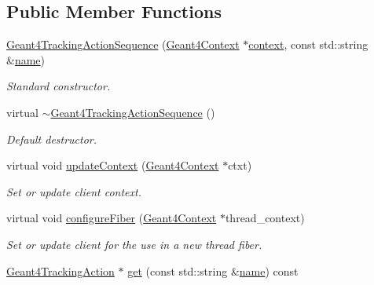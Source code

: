 \subsection*{Public Member Functions}
\begin{DoxyCompactItemize}
\item 
\hyperlink{class_d_d4hep_1_1_simulation_1_1_geant4_tracking_action_sequence_aea13a63c92a90e23145f5b2ab1f96c6e}{Geant4\+Tracking\+Action\+Sequence} (\hyperlink{class_d_d4hep_1_1_simulation_1_1_geant4_context}{Geant4\+Context} $\ast$\hyperlink{class_d_d4hep_1_1_simulation_1_1_geant4_action_aa9d87f0ec2a72b7fc2591b18f98d75cf}{context}, const std\+::string \&\hyperlink{class_d_d4hep_1_1_simulation_1_1_geant4_action_af374e70b014d16afb81dd9d77cc3894b}{name})
\begin{DoxyCompactList}\small\item\em Standard constructor. \end{DoxyCompactList}\item 
virtual \hyperlink{class_d_d4hep_1_1_simulation_1_1_geant4_tracking_action_sequence_afa29770b5c1d47910c23dc3855244bcf}{$\sim$\+Geant4\+Tracking\+Action\+Sequence} ()
\begin{DoxyCompactList}\small\item\em Default destructor. \end{DoxyCompactList}\item 
virtual void \hyperlink{class_d_d4hep_1_1_simulation_1_1_geant4_tracking_action_sequence_a7afac2362f030a76e39cbdc7ab5b0ee7}{update\+Context} (\hyperlink{class_d_d4hep_1_1_simulation_1_1_geant4_context}{Geant4\+Context} $\ast$ctxt)
\begin{DoxyCompactList}\small\item\em Set or update client context. \end{DoxyCompactList}\item 
virtual void \hyperlink{class_d_d4hep_1_1_simulation_1_1_geant4_tracking_action_sequence_afff6a1aeeb049c8ee0ee2819d54b65d0}{configure\+Fiber} (\hyperlink{class_d_d4hep_1_1_simulation_1_1_geant4_context}{Geant4\+Context} $\ast$thread\+\_\+context)
\begin{DoxyCompactList}\small\item\em Set or update client for the use in a new thread fiber. \end{DoxyCompactList}\item 
\hyperlink{class_d_d4hep_1_1_simulation_1_1_geant4_tracking_action}{Geant4\+Tracking\+Action} $\ast$ \hyperlink{class_d_d4hep_1_1_simulation_1_1_geant4_tracking_action_sequence_aa3c28c0e0ac499db301867e9d717f04d}{get} (const std\+::string \&\hyperlink{class_d_d4hep_1_1_simulation_1_1_geant4_action_af374e70b014d16afb81dd9d77cc3894b}{name}) const

\end{DoxyCompactItemize}
